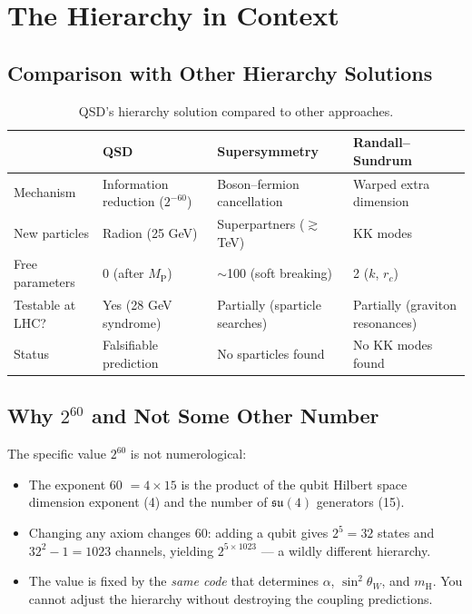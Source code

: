 \documentclass[11pt,a4paper]{article}
\theoremstyle{definition}
\theoremstyle{remark}
\newcommand{\Mpl}{M_{\mathrm{P}}}
\newcommand{\mH}{m_\mathrm{H}}
\begin{document}
\section{The Hierarchy in Context}
\label{sec:context}

\subsection{Comparison with Other Hierarchy Solutions}

\begin{table}[H]
\centering
\small
\begin{tabular}{p{3.5cm}p{3.5cm}p{3.5cm}p{3.5cm}}
\toprule
& \textbf{QSD} & \textbf{Supersymmetry} & \textbf{Randall--Sundrum} \\
\midrule
Mechanism & Information reduction ($2^{-60}$) & Boson--fermion cancellation & Warped extra dimension \\[4pt]
New particles & Radion (25 GeV) & Superpartners ($\gtrsim$TeV) & KK modes \\[4pt]
Free parameters & 0 (after $\Mpl$) & $\sim$100 (soft breaking) & 2 ($k$, $r_c$) \\[4pt]
Testable at LHC? & Yes (28 GeV syndrome) & Partially (sparticle searches) & Partially (graviton resonances) \\[4pt]
Status & Falsifiable prediction & No sparticles found & No KK modes found \\
\bottomrule
\end{tabular}
\caption{QSD's hierarchy solution compared to other approaches.}
\label{tab:comparison}
\end{table}

\subsection{Why $2^{60}$ and Not Some Other Number}

The specific value $2^{60}$ is not numerological:

\begin{itemize}[nosep]
\item The exponent 60 $= 4 \times 15$ is the product of the qubit Hilbert space dimension exponent (4) and the number of $\mathfrak{su}(4)$ generators (15).
\item Changing any axiom changes 60: adding a qubit gives $2^5 = 32$ states and $32^2 - 1 = 1023$ channels, yielding $2^{5 \times 1023}$ --- a wildly different hierarchy.
\item The value is fixed by the \emph{same code} that determines $\alpha$, $\sin^2\theta_W$, and $\mH$. You cannot adjust the hierarchy without destroying the coupling predictions.
\end{itemize}
\end{document}
